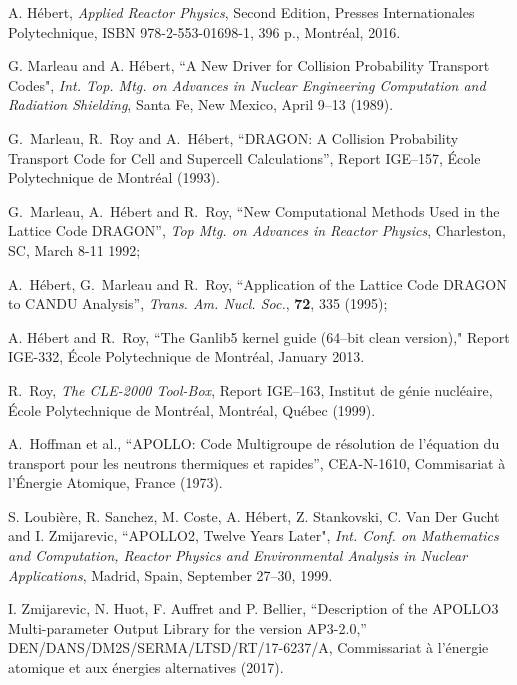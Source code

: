 \begin{thebibliography}{99}

A. H\'ebert, {\sl Applied Reactor Physics}, Second Edition, Presses Internationales Polytechnique, ISBN 978-2-553-01698-1, 396 p., Montr\'eal, 2016.

G. Marleau and A. H\'ebert, ``A New Driver for Collision Probability Transport
Codes", {\sl Int. Top. Mtg. on Advances in Nuclear Engineering
Computation and Radiation Shielding}, Santa Fe, New Mexico, April 9--13 (1989).

G.~Marleau, R.~Roy and A.~H\'{e}bert,
``DRAGON: A Collision Probability Transport Code for Cell and Supercell
Calculations'',  Report IGE--157,  \'{E}cole Polytechnique de Montr\'{e}al
(1993).

G.~Marleau, A.~H\'{e}bert and R.~Roy, ``New Computational Methods Used in
the Lattice Code DRAGON'',  {\sl Top Mtg. on Advances in Reactor Physics},
Charleston, SC, March 8-11 1992; 

A.~H\'{e}bert, G.~Marleau and R.~Roy, ``Application of the Lattice Code
DRAGON to CANDU Analysis'',  {\sl Trans. Am. Nucl. Soc.}, {\bf 72}, 335 (1995);

A. H\'ebert and R.~Roy,
``The Ganlib5 kernel guide (64--bit clean version),"
Report IGE-332, \'Ecole Polytechnique de Montr\'eal, January 2013.

R.~Roy, \textsl{The CLE-2000 Tool-Box}, 
Report IGE--163, Institut de g\'enie nucl\'eaire, \'{E}cole Polytechnique de Montr\'eal,
Montr\'{e}al, Qu\'{e}bec (1999).

A.~Hoffman et al., ``APOLLO: Code Multigroupe de r\'esolution de l'\'equation du
transport pour les neutrons  thermiques et rapides'', CEA-N-1610, Commisariat
\`a l'\'Energie Atomique, France (1973).

S. Loubi\`ere, R. Sanchez, M. Coste, A. H\'ebert, Z. Stankovski, C. Van Der Gucht and I. Zmijarevic, ``APOLLO2,
Twelve Years Later", {\sl Int. Conf. on Mathematics and Computation,
Reactor Physics and Environmental Analysis in Nuclear Applications}, Madrid, Spain, September 27--30, 1999.

I. Zmijarevic, N. Huot, F. Auffret and P. Bellier, ``Description of the APOLLO3 Multi-parameter Output Library for the
version AP3-2.0,'' DEN/DANS/DM2S/SERMA/LTSD/RT/17-6237/A, Commissariat \`a l'\'energie atomique et aux \'energies alternatives (2017).


\end{thebibliography}
